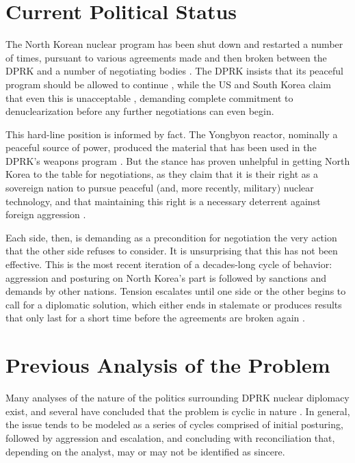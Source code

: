 \section{Current Political Status}

The North Korean nuclear program has been shut down and restarted a number of times, pursuant to various agreements made and then broken between the DPRK and a number of negotiating bodies \cite{bajoria,davenport}. The DPRK insists that its peaceful program should be allowed to continue \cite{kcna2}, while the US and South Korea claim that even this is unacceptable \cite{lee}, demanding complete commitment to denuclearization before any further negotiations can even begin.

This hard-line position is informed by fact. The Yongbyon reactor, nominally a peaceful source of power, produced the material that has been used in the DPRK's weapons program \cite{hecker}. But the stance has proven unhelpful in getting North Korea to the table for negotiations, as they claim that it is their right as a sovereign nation to pursue peaceful (and, more recently, military) nuclear technology, and that maintaining this right is a necessary deterrent against foreign aggression \cite{kcna,kcna2}.

Each side, then, is demanding as a precondition for negotiation the very action that the other side refuses to consider. It is unsurprising that this has not been effective. This is the most recent iteration of a decades-long cycle of behavior: aggression and posturing on North Korea's part is followed by sanctions and demands by other nations. Tension escalates until one side or the other begins to call for a diplomatic solution, which either ends in stalemate or produces results that only last for a short time before the agreements are broken again \cite{bajoria, davenport}.

\section{Previous Analysis of the Problem}

Many analyses of the nature of the politics surrounding DPRK nuclear diplomacy exist, and several have concluded that the problem is cyclic in nature \cite{blair,cfr,fisher,gause,habib,jun}. In general, the issue tends to be modeled as a series of cycles comprised of initial posturing, followed by aggression and escalation, and concluding with reconciliation that, depending on the analyst, may or may not be identified as sincere.

